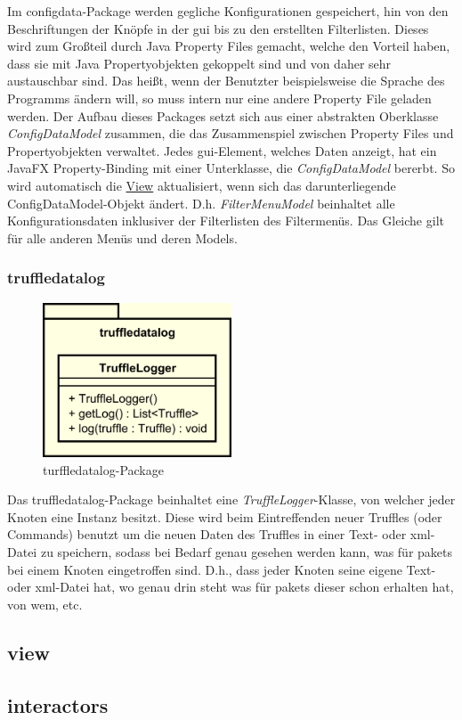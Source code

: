     \medskip
    Im configdata-Package werden gegliche Konfigurationen gespeichert, hin von den
    Beschriftungen der Knöpfe in der \gls{gui} bis zu den erstellten Filterlisten. Dieses
    wird zum Großteil durch Java Property Files gemacht, welche den Vorteil haben, dass
    sie mit Java Propertyobjekten gekoppelt sind und von daher sehr austauschbar sind.
    Das heißt, wenn der Benutzter beispielsweise die Sprache des Programms ändern
    will, so muss intern nur eine andere Property File geladen werden.
    \newline
    \newline
    Der Aufbau dieses Packages setzt sich aus einer abstrakten Oberklasse
    \textit{ConfigDataModel} zusammen, die das Zusammenspiel zwischen Property Files
    und Propertyobjekten verwaltet. Jedes \gls{gui}-Element, welches Daten anzeigt, hat
    ein JavaFX Property-Binding mit einer Unterklasse, die \textit{ConfigDataModel}
    bererbt. So wird automatisch die \hyperref[subsec:view]{View} aktualisiert,
    wenn sich das darunterliegende ConfigDataModel-Objekt ändert. D.h.
    \textit{FilterMenuModel} beinhaltet alle Konfigurationsdaten inklusiver der
    Filterlisten des Filtermenüs. Das Gleiche gilt für alle anderen Menüs und
    deren Models.


    \subsubsection{truffledatalog}
    \label{subsubsec:graphlog}

    \begin{figure}[H]
      \centering
      \includegraphics[width=0.5\textwidth]{../diagramimages/truffledatalog.png}
      \caption{turffledatalog-Package}
    \end{figure}

    \medskip
    Das truffledatalog-Package beinhaltet eine \textit{TruffleLogger}-Klasse, von
    welcher jeder Knoten eine Instanz besitzt. Diese wird beim Eintreffenden neuer Truffles
    (oder Commands) benutzt um die neuen Daten des Truffles in einer Text- oder xml-Datei zu speichern,
    sodass bei Bedarf genau gesehen werden kann, was für \glspl{paket} bei einem
    Knoten eingetroffen sind. D.h., dass jeder Knoten seine eigene Text- oder xml-Datei
    hat, wo genau drin steht was für \glspl{paket} dieser schon erhalten hat,
    von wem, etc.

\subsection{view}
\label{subsec:view}

\subsection{interactors}
\label{subsec:interactors}
